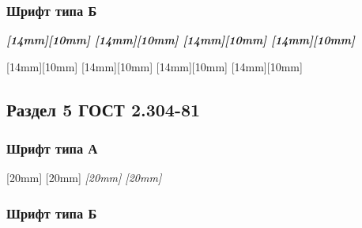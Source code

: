 \newpage
\subsubsection{Шрифт типа Б}

{
  \bfseries
  {
    \slshape
    [14mm][10mm]
    [14mm][10mm]
    [14mm][10mm]
    [14mm][10mm]
  }

  {
    [14mm][10mm]
    [14mm][10mm]
    [14mm][10mm]
    [14mm][10mm]
  }
}

\newpage
\subsection{Раздел 5 ГОСТ 2.304-81}

\subsubsection{Шрифт типа А}

{
  {
    \DrawChars{\textAlpha \textBeta \textGamma \textDelta \textEpsilon \textZeta \textEta \textTheta \textIota \textKappa \textLambda \textMu \textNu \textXi}
    \DrawChars{\textOmicron \textPi \textRho \textSigma \textTau \textUpsilon \textPhi \textChi \textPsi \textOmega}
    \DrawChars{\textalpha \textbeta \textgamma \textdelta \textepsilon \textzeta \texteta \texttheta \textiota \textkappa \textlambda \textmu \textnu}[20mm]
    \DrawChars{\textxi \textomicron \textpi \textrho \textsigma \texttau \textupsilon \textphi \textchi \textpsi \textomega}[20mm]
  }
  {
    \slshape
    \DrawChars{\textAlpha \textBeta \textGamma \textDelta \textEpsilon \textZeta \textEta \textTheta \textIota \textKappa \textLambda \textMu \textNu \textXi \textOmicron}
    \DrawChars{\textPi \textRho \textSigma \textTau \textUpsilon \textPhi \textChi \textPsi \textOmega}
    \DrawChars{\textalpha \textbeta \textgamma \textdelta \textepsilon \textzeta \texteta \texttheta \textiota \textkappa \textlambda \textmu \textnu \textxi \textomicron}[20mm]
    \DrawChars{\textpi \textrho \textsigma \texttau \textupsilon \textphi \textchi \textpsi \textomega}[20mm]
  }
}

\newpage
\subsubsection{Шрифт типа Б}

